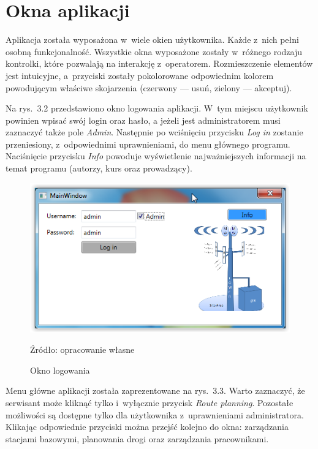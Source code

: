 \documentclass[12pt,a4paper]{report}
\begin{document}
\section{Okna aplikacji}
Aplikacja została wyposażona w~wiele okien użytkownika. Każde z~nich pełni osobną funkcjonalność. Wszystkie okna wyposażone zostały w~różnego rodzaju kontrolki, które pozwalają na interakcję z~operatorem. Rozmieszczenie elementów jest intuicyjne, a~przyciski zostały pokolorowane odpowiednim kolorem powodującym właściwe skojarzenia (czerwony --- usuń, zielony --- akceptuj).

Na rys.~3.2 przedstawiono okno logowania aplikacji. W~tym miejscu użytkownik powinien wpisać swój login oraz hasło, a jeżeli jest administratorem musi zaznaczyć także pole \textit{Admin}. Następnie po wciśnięciu przycisku \textit{Log in} zostanie przeniesiony, z~odpowiednimi uprawnieniami, do menu głównego programu. Naciśnięcie przycisku \textit{Info} powoduje wyświetlenie najważniejszych informacji na temat programu (autorzy, kurs oraz prowadzący).

\begin{figure}[!bht]
\centering
\includegraphics[scale=0.5]{Pictures/MainWindow.png}
\label{fig: MainWindow}
\caption{Okno logowania}{Źródło: opracowanie własne}
\end{figure}

Menu główne aplikacji została zaprezentowane na rys.~3.3. Warto zaznaczyć, że serwisant może kliknąć tylko i~wyłącznie przycisk \textit{Route planning}. Pozostałe możliwości są dostępne tylko dla użytkownika z~uprawnieniami administratora. Klikając odpowiednie przyciski można przejść kolejno do okna: zarządzania stacjami bazowymi, planowania drogi oraz zarządzania pracownikami.
\end{document}
